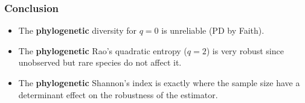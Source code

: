 \documentclass[10pt]{beamer}
\begin{document}
\begin{frame}[cc]
\frametitle{Conclusion}

	\begin{itemize}
	\item<1> The \textbf{phylogenetic} diversity for $q=0$ is unreliable (PD by Faith).
	\item<1> The \textbf{phylogenetic} Rao's quadratic entropy ($q=2$) is very robust since unobserved but rare species do not affect it.
	\item<1> The \textbf{phylogenetic} Shannon's index is exactly where the sample size have a determinant effect on the robustness of the estimator.
	\end{itemize}
	
\end{frame}
\end{document}
